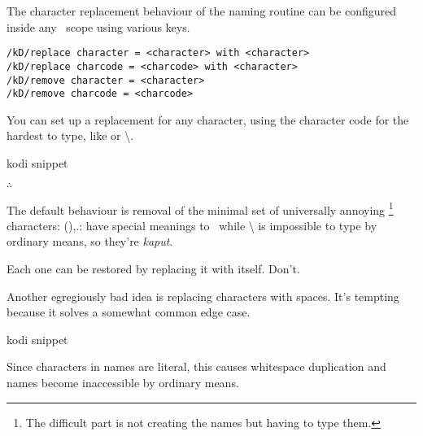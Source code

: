 The character replacement behaviour of the naming routine can be configured
inside any \koDi\ scope using various keys.

\begin{lstlisting}
/kD/replace character = <character> with <character>
/kD/replace charcode = <charcode> with <character>
/kD/remove character = <character>
/kD/remove charcode = <charcode>
\end{lstlisting}




You can set up a replacement for any character, using the character code for
the hardest to type, like {\ttfamily \textvisiblespace} or {\ttfamily \textbackslash}.

\begin{tcblisting}{kodi snippet}
\end{tcblisting}

\hfill$\therefore$\hfill\null

The default behaviour is removal of the minimal set of universally annoying%
\footnote{The difficult part is not creating the names but having to type them.}
characters: {\ttfamily (),.:}  have special meanings to \TikZ\ while
{\ttfamily \textbackslash} is impossible to type by ordinary means, so they're \emph{kaput}.

Each one can be restored by replacing it with itself. Don't.

Another egregiously bad idea is replacing characters with spaces.
It's tempting because it solves a somewhat common edge case.

\begin{tcblisting}{kodi snippet}
\end{tcblisting}

Since characters in names are literal, this causes whitespace
duplication and names become inaccessible by ordinary means.

